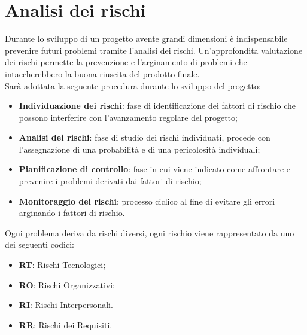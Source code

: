 \section{Analisi dei rischi}

Durante lo sviluppo di un progetto avente grandi dimensioni è indispensabile prevenire 
futuri problemi tramite l'analisi dei rischi. Un'approfondita valutazione dei rischi permette la prevenzione e l'arginamento di problemi che intaccherebbero la buona riuscita del prodotto finale.\\
Sarà adottata la seguente procedura durante lo sviluppo del progetto:

\begin{itemize}
	\item \textbf{Individuazione dei rischi}: fase di identificazione dei fattori di rischio che possono interferire con l'avanzamento regolare del progetto;
	\item \textbf{Analisi dei rischi}: fase di studio dei rischi individuati, procede con l'assegnazione di una probabilità e di una pericolosità individuali;
	\item \textbf{Pianificazione di controllo}: fase in cui viene indicato come affrontare e prevenire
	i problemi derivati dai fattori di rischio;
	\item \textbf{Monitoraggio dei rischi}: processo ciclico al fine di evitare gli errori arginando i 
	fattori di rischio.
\end{itemize}
Ogni problema deriva da rischi diversi, ogni rischio viene rappresentato da uno dei seguenti codici:

\begin{itemize}
	\item \textbf{RT}: Rischi Tecnologici;
	\item \textbf{RO}: Rischi Organizzativi;
	\item \textbf{RI}: Rischi Interpersonali.
	\item \textbf{RR}: Rischi dei Requisiti.
\end{itemize}

